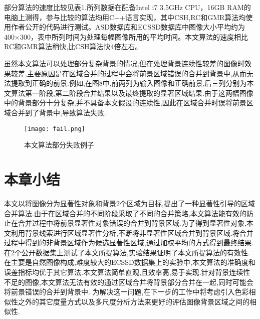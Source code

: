 部分算法的速度比较见表1.所列数据在配备Intel i7 3.5GHz CPU，16GB RAM的电脑上测得，参与比较的算法均用C++语言实现，其中CSH,RC和GMR算法均使用作者公开的代码进行测试。ASD数据库和ECSSD数据库中图像大小平均约为400×300，表中所列时间为处理每幅图像所用的平均时间。本文算法的速度相比RC和GMR算法稍快,比CSH算法快4倍左右。\par


虽然本文算法可以处理部分复杂背景的情况,但在处理背景连续性较差的图像时效果较差,主要原因是在区域合并的过程中会将前景区域错误的合并到背景中,从而无法提取到正确的前景.例如,在图8中,前两列为输入图像和正确前景,后三列分别为本文算法第一阶段,第二阶段合并结果以及最终提取的显著区域结果.由于这两幅图像中的背景部分十分复杂,并不具备本文假设的连续性,因此在区域合并时误将前景区域合并到了背景中,导致算法失败.
 \begin{figure}[h]
  \centering%
      {\texttt{[image: fail.png]}}

  \caption{本文算法部分失败例子}
  \label{fig:chap2:comp1}
\end{figure}


\section{本章小结}
本文以将图像分为显著性对象和背景2个区域为目标,提出了一种显著性引导的区域合并算法.由于在区域合并的不同阶段采取了不同的合并策略,本文算法能有效的防止在合并过程中将前景显著性对象错误的合并到背景区域.为了得到显著性对象,本文利用背景线索进行区域显著性分析,不断将非显著性区域合并到背景区域.将合并过程中得到的非背景区域作为候选显著性区域,通过加权平均的方式得到最终结果.在2个公开数据集上测试了本文所提算法,实验结果证明了本文所提算法的有效性.在主要是自然图像构成,难度较大的ECSSD数据集上的实验中,本文算法的准确度和误差指标均优于其它算法.本文算法简单直观,且效率高,易于实现.针对背景连续性不足的图像,本文算法无法有效的通过区域合并将背景部分合并在一起,同时可能会将前景错误的合并到背景中. 为解决这一问题,在下一步的工作中将考虑引入色彩相似性之外的其它度量方式以及多尺度分析方法来更好的评估图像背景区域之间的相似性.
